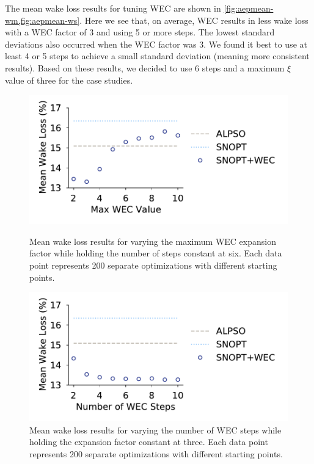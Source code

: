 \documentclass[hidelinks,sort&compress,AMA,STIX1COL]{WileyNJD-v2}
\providecommand{\DIFaddbeginFL}{} %
\providecommand{\DIFaddendFL}{} %
\providecommand{\DIFdelbeginFL}{} %
\providecommand{\DIFdelendFL}{} %
\newcommand{\DIFscaledelfig}{0.5}
\newlength{\DIFdelgraphicswidth} %
\newlength{\DIFdelgraphicsheight} %
\newcommand{\DIFaddincludegraphics}[2][]{{\color{blue}\fbox{\DIFOincludegraphics[#1]{#2}}}} %
\newcommand{\DIFdelincludegraphics}[2][]{%
\sbox{\DIFdelgraphicsbox}{\DIFOincludegraphics[#1]{#2}}%
\settoboxwidth{\DIFdelgraphicswidth}{\DIFdelgraphicsbox} %
\settoboxtotalheight{\DIFdelgraphicsheight}{\DIFdelgraphicsbox} %
\scalebox{\DIFscaledelfig}{%
\parbox[b]{\DIFdelgraphicswidth}{\usebox{\DIFdelgraphicsbox}\\[-\baselineskip] \rule{\DIFdelgraphicswidth}{0em}}\llap{\resizebox{\DIFdelgraphicswidth}{\DIFdelgraphicsheight}{%
\setlength{\unitlength}{\DIFdelgraphicswidth}%
\begin{picture}(1,1)%
\thicklines\linethickness{2pt} %
{\color[rgb]{1,0,0}\put(0,0){\framebox(1,1){}}}%
{\color[rgb]{1,0,0}\put(0,0){\line( 1,1){1}}}%
{\color[rgb]{1,0,0}\put(0,1){\line(1,-1){1}}}%
\end{picture}%
}\hspace*{3pt}}} %
} %
\DeclareRobustCommand{\DIFaddbeginFL}{\DIFOaddbeginFL \let\includegraphics\DIFaddincludegraphics} %
\DeclareRobustCommand{\DIFaddendFL}{\DIFOaddendFL \let\includegraphics\DIFOincludegraphics} %
\DeclareRobustCommand{\DIFdelbeginFL}{\DIFOdelbeginFL \let\includegraphics\DIFdelincludegraphics} %
\DeclareRobustCommand{\DIFdelendFL}{\DIFOaddendFL \let\includegraphics\DIFOincludegraphics} %
\begin{document}
The mean wake loss results for tuning WEC are shown in \cref{fig:aepmean-wm,fig:aepmean-ws}. Here we see that, on average, WEC results in less wake loss with a WEC factor of 3 and using 5 or more steps. The lowest standard deviations also occurred when the WEC factor was 3. We found it best to use at least 4 or 5 steps to achieve a small standard deviation (meaning more consistent results). Based on these results, we decided to use 6 steps and a maximum $\xi$ value of three for the case studies.
%
\begin{figure}[ht]
	\centering
	\begin{minipage}[t]{0.47\textwidth}
		\centering
		\DIFdelbeginFL %
\DIFdelendFL \DIFaddbeginFL \includegraphics[width=\textwidth, trim={0cm 0cm 0cm 0cm}, clip]{tests/Figure_17}
		\DIFaddendFL \caption{Mean wake loss results for varying the maximum WEC expansion factor while holding the number of steps constant at six. Each data point represents 200 separate optimizations with different starting points.}
		\label{fig:aepmean-wm}
	\end{minipage}\hspace{1pc}
	\begin{minipage}[t]{0.47\textwidth}
		\centering
		\DIFdelbeginFL %
\DIFdelendFL \DIFaddbeginFL \includegraphics[width=\textwidth]{tests/Figure_18}
		\DIFaddendFL \caption{Mean wake loss results for varying the number of WEC steps while holding the expansion factor constant at three. Each data point represents 200 separate optimizations with different starting points.}
		\label{fig:aepmean-ws}
	\end{minipage}
\end{figure}
\end{document}
